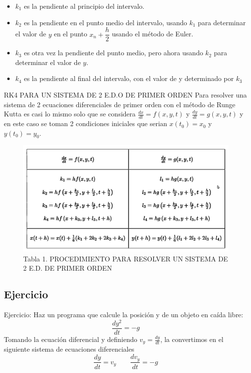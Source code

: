 \documentclass[11pt]{beamer}
\begin{document}
		\begin{frame}
			\begin{itemize}
				\justifying
				\item$k_1$ es la pendiente al principio del intervalo.
				\item$k_2$ es la pendiente en el punto medio del intervalo, usando $k_1$ para determinar el 
					valor de $ y $ en el punto $x_n+\dfrac{h}{2}$ usando el método de Euler. 
				\item$k_3$ es otra vez la pendiente del punto medio, pero ahora usando $k_2$ para determinar 
					el valor de $y$.
				\item$k_4$ es la pendiente al final del intervalo, con el valor de y determinado por $k_3$
			\end{itemize}
		\end{frame}

		\begin{frame}{RK4 PARA UN SISTEMA DE 2 E.D.O DE PRIMER ORDEN}
			Para resolver una sistema de 2 ecuaciones diferenciales de primer orden con el método de Runge Kutta 
			es casi lo mismo solo que se considera $ \frac{dx}{dt} = f(x,y,t) $ y $ \frac{dy}{dt} = g(x,y,t) $ y 
			en este caso se toman 2 condiciones iniciales que serian $ x(t_0) = x_0 $ y $ y(t_0) = y_0 $.
		\end{frame}

		\begin{frame}
			\begin{figure}[H]
				\centering
				\includegraphics[width=\linewidth]{Tab1.png}
				Tabla 1. PROCEDIMIENTO PARA RESOLVER UN SISTEMA DE 2 E.D. DE PRIMER ORDEN
				\centering
			\end{figure}
		\end{frame}

		\subsection{Ejercicio}
			\begin{frame}{Ejercicio:}
				Haz un programa que calcule la posición y de un objeto en caída libre:
				$$ \frac{dy^2}{dt} = -g $$
				Tomando la ecuación diferencial y definiendo $ v_y = \frac{dy}{dt} $, la convertimos en el siguiente
				sistema de ecuaciones diferenciales
				$$ \frac{dy}{dt} = v_y \qquad \frac{dv_y}{dt} = -g $$
			\end{frame}
			
\end{document}
